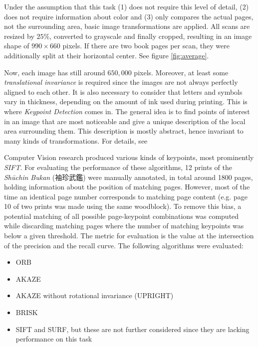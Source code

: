 \documentclass{ltjarticle}
\begin{document}
Under the assumption that this task (1) does not require this level of detail, (2) does not require information about color and (3) only compares the actual pages, not the surrounding area, basic image transformations are applied. All scans are resized by $25\%$, converted to grayscale and finally cropped, resulting in an image shape of $990 \times 660$ pixels. If there are two book pages per scan, they were additionally split at their horizontal center. See figure \ref{fig:average}.

Now, each image has still around $650,000$ pixels. Moreover, at least some \emph{translational invariance} is required since the images are not always perfectly aligned to each other. It is also necessary to consider that letters and symbols vary in thickness, depending on the amount of ink used during printing. This is where \emph{Keypoint Detection} comes in. The general idea is to find points of interest in an image that are most noticeable and give a unique description of the local area surrounding them. This description is mostly abstract, hence invariant to many kinds of transformations. For details, see \cite[Ch.4]{szeliski2010computer}

Computer Vision research produced various kinds of keypoints, most prominently \emph{SIFT}.\cite{lowe2004sift} For evaluating the performance of these algorithms, 12 prints of the \emph{Shūchin Bukan} (袖珍武鑑) were manually annotated, in total around 1800 pages, holding information about the position of matching pages. However, most of the time an identical page number corresponds to matching page content (e.g. page 10 of two prints was made using the same woodblock). To remove this bias, a potential matching of all possible page-keypoint combinations was computed while discarding matching pages where the number of matching keypoints was below a given threshold. The metric for evaluation is the value at the intersection of the precision and the recall curve. The following algorithms were evaluated:

\begin{itemize}
    \setlength\itemsep{0em}
    \item ORB\cite{rublee2011orb}
    \item AKAZE\cite{alcantarilla2011fast}
    \item AKAZE without rotational invariance (UPRIGHT)
    \item BRISK\cite{leutenegger2011brisk}
    \item SIFT and SURF\cite{bay2006surf}, but these are not further considered since they are lacking performance on this task
\end{itemize}
\end{document}
